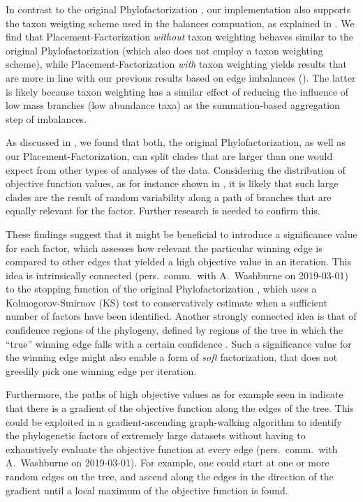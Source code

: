 In contrast to the original Phylofactorization \cite{Washburne2017a}, our implementation also supports
the taxon weigting scheme used in the balances compuation, as explained in .
We find that Placement-Factorization \emph{without} taxon weighting
behaves similar to the original Phylofactorization (which also does not employ a taxon weighting scheme),
while Placement-Factorization \emph{with} taxon weighting
yields results that are more in line with our previous results based on edge imbalances
().
The latter is likely because taxon weighting has a similar effect of reducing the influence of low mass branches
(low abundance taxa) as the summation-based aggregation step of imbalances.

As discussed in ,
we found that both, the original Phylofactorization, as well as our Placement-Factorization,
can split clades that are larger than one would expect from other types of analyses of the data.
Considering the distribution of objective function values, as for instance shown in ,
it is likely that such large clades are the result of random variability
along a path of branches that are equally relevant for the factor.
Further research is needed to confirm this.

These findings suggest that it might be beneficial to introduce a significance value for each factor,
which assesses how relevant the particular winning edge is
compared to other edges that yielded a high objective value in an iteration.
This idea is intrinsically connected (pers.~comm.~with A.~Washburne on 2019-03-01)
to the stopping function of the original Phylofactorization \cite{Washburne2017a},
which uses a Kolmogorov-Smirnov (KS) test \cite{Massey1951}
to conservatively estimate when a sufficient number of factors have been identified.
Another strongly connected idea is that of confidence regions of the phylogeny,
defined by regions of the tree in which the ``true'' winning edge falls with a certain confidence \cite{Washburne2019}.
Such a significance value for the winning edge might also enable a form of \emph{soft} factorization,
that does not greedily pick one winning edge per iteration.

Furthermore, the paths of high objective values as for example seen in  indicate
that there is a gradient of the objective function along the edges of the tree.
This could be exploited in a gradient-ascending graph-walking algorithm to identify the phylogenetic factors
of extremely large datasets without having to exhaustively evaluate the objective function at every edge
(pers.~comm.~with A.~Washburne on 2019-03-01).
For example, one could start at one or more random edges on the tree,
and ascend along the edges in the direction of the gradient until a local maximum of the objective function is found.


